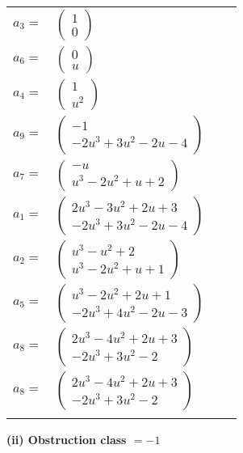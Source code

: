 \documentclass[1p]{elsarticle_modified}
\theoremstyle{definition}
\begin{document}
\begin{tabular}{m{7pt} m{180pt} m{7pt} m{180pt} }
\flushright $a_{3}=$&$\begin{pmatrix}1\\0\end{pmatrix}$ \\
\flushright $a_{6}=$&$\begin{pmatrix}0\\u\end{pmatrix}$ \\
\flushright $a_{4}=$&$\begin{pmatrix}1\\u^2\end{pmatrix}$ \\
\flushright $a_{9}=$&$\begin{pmatrix}-1\\-2 u^3+3 u^2-2 u-4\end{pmatrix}$ \\
\flushright $a_{7}=$&$\begin{pmatrix}- u\\u^3-2 u^2+u+2\end{pmatrix}$ \\
\flushright $a_{1}=$&$\begin{pmatrix}2 u^3-3 u^2+2 u+3\\-2 u^3+3 u^2-2 u-4\end{pmatrix}$ \\
\flushright $a_{2}=$&$\begin{pmatrix}u^3- u^2+2\\u^3-2 u^2+u+1\end{pmatrix}$ \\
\flushright $a_{5}=$&$\begin{pmatrix}u^3-2 u^2+2 u+1\\-2 u^3+4 u^2-2 u-3\end{pmatrix}$ \\
\flushright $a_{8}=$&$\begin{pmatrix}2 u^3-4 u^2+2 u+3\\-2 u^3+3 u^2-2\end{pmatrix}$\\ \flushright $a_{8}=$&$\begin{pmatrix}2 u^3-4 u^2+2 u+3\\-2 u^3+3 u^2-2\end{pmatrix}$\\&\end{tabular}
\flushleft \textbf{(ii) Obstruction class $= -1$}\\~\\
\end{document}
